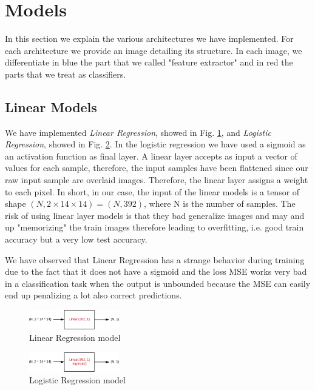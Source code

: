\documentclass[journal, a4paper]{IEEEtran}
\begin{document}
\section{Models}
In this section we explain the various architectures we have implemented. For each architecture we provide an image detailing its structure. In each image, we differentiate in blue the part that we called "feature extractor" and in red the parts that we treat as classifiers.

\subsection{Linear Models}
\label{sec:linearmodel}
We have implemented \textit{Linear Regression},  showed in Fig. \ref{fig:linearregression}, and \textit{Logistic Regression}, showed in Fig. \ref{fig:logisticregression}. In the logistic regression we have used a sigmoid as an activation function as final layer. A linear layer accepts as input a vector of values for each sample, therefore, the input samples have been flattened since our raw input sample are overlaid images. Therefore, the linear layer assigns a weight to each pixel. In short, in our case, the input of the linear models is a tensor of shape $(N, 2 \times 14 \times 14)=(N, 392)$, where N is the number of samples. The risk of using linear layer models is that they bad generalize images and may and up "memorizing" the train images therefore leading to overfitting, i.e. good train accuracy but a very low test accuracy.

We have observed that Linear Regression has a strange behavior during training due to the fact that it does not have a sigmoid and the loss MSE works very bad in a classification task when the output is unbounded because the MSE can easily end up penalizing a lot also correct predictions.

\begin{figure}[!h]
    \centering
    \includegraphics[width=0.35\textwidth]{linearregression.png}
    \caption{Linear Regression model}
    \label{fig:linearregression}
\end{figure}

\begin{figure}[!h]
    \centering
    \includegraphics[width=0.35\textwidth]{logistic.png}
    \caption{Logistic Regression model}
    \label{fig:logisticregression}
\end{figure}
\end{document}
